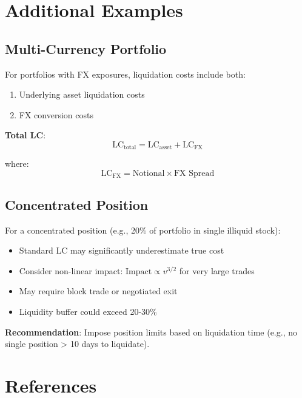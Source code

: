 \documentclass[11pt,a4paper]{article}
\begin{document}
\section{Additional Examples}

\subsection{Multi-Currency Portfolio}

For portfolios with FX exposures, liquidation costs include both:
\begin{enumerate}
    \item Underlying asset liquidation costs
    \item FX conversion costs
\end{enumerate}

\textbf{Total LC}:
\begin{equation}
\text{LC}_{\text{total}} = \text{LC}_{\text{asset}} + \text{LC}_{\text{FX}}
\end{equation}

where:
\begin{equation}
\text{LC}_{\text{FX}} = \text{Notional} \times \text{FX Spread}
\end{equation}

\subsection{Concentrated Position}

For a concentrated position (e.g., 20\% of portfolio in single illiquid stock):

\begin{itemize}
    \item Standard LC may significantly underestimate true cost
    \item Consider non-linear impact: $\text{Impact} \propto v^{3/2}$ for very large trades
    \item May require block trade or negotiated exit
    \item Liquidity buffer could exceed 20-30\%
\end{itemize}

\textbf{Recommendation}: Impose position limits based on liquidation time (e.g., no single position > 10 days to liquidate).

\section{References}
\end{document}
